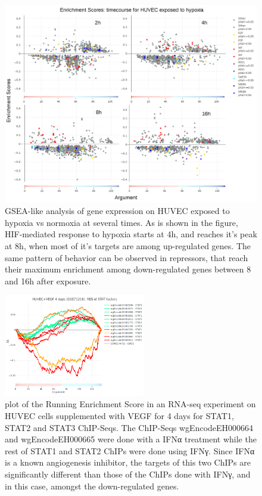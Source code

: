\documentclass[a4paper, 12pt ]{article}
\begin{document}
\begin{figure}[h]
	\centering
	\includegraphics[width=\textwidth]{graf-tfea2}
	\caption{GSEA-like analysis of gene expression on HUVEC exposed to hypoxia vs normoxia at several times. As is shown in the figure, HIF-mediated response to hypoxia starts at 4h, and reaches it's peak at 8h, when most of it's targets are among up-regulated genes. The same pattern of behavior can be observed in repressors, that reach their maximum enrichment among down-regulated genes between 8 and 16h after exposure.}
\end{figure}

\begin{figure}
	\centering
	\includegraphics[width=0.55\textwidth]{graf-tfea3}
	\caption{plot of the Running Enrichment Score in an RNA-seq experiment on HUVEC cells supplemented with VEGF for 4 days for STAT1, STAT2 and STAT3 ChIP-Seqs.
	The ChIP-Seqs wgEncodeEH000664 and wgEncodeEH000665 were done with a IFNα treatment while the rest of STAT1 and STAT2 ChIPs were done using IFNγ. Since IFNα is a known angiogenesis inhibitor, the targets of this two ChIPs are significantly different than those of the ChIPs done with IFNγ, and in this case, amongst the down-regulated genes.}
\end{figure}
\end{document}
